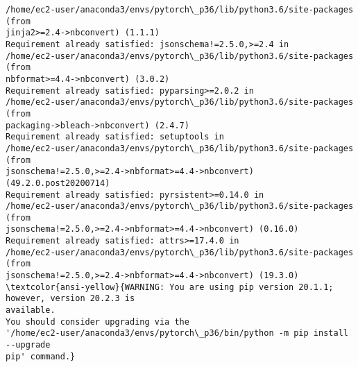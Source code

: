 \documentclass[11pt]{article}
\makeatletter
\newcommand{\boxspacing}{\kern\kvtcb@left@rule\kern\kvtcb@boxsep}
\newcommand{\prompt}[4]{
        \ttfamily\llap{{\color{#2}[#3]:\hspace{3pt}#4}}\vspace{-\baselineskip}
    }
\makeatother
\begin{document}
\begin{Verbatim}[commandchars=\\\{\}]
/home/ec2-user/anaconda3/envs/pytorch\_p36/lib/python3.6/site-packages (from
jinja2>=2.4->nbconvert) (1.1.1)
Requirement already satisfied: jsonschema!=2.5.0,>=2.4 in
/home/ec2-user/anaconda3/envs/pytorch\_p36/lib/python3.6/site-packages (from
nbformat>=4.4->nbconvert) (3.0.2)
Requirement already satisfied: pyparsing>=2.0.2 in
/home/ec2-user/anaconda3/envs/pytorch\_p36/lib/python3.6/site-packages (from
packaging->bleach->nbconvert) (2.4.7)
Requirement already satisfied: setuptools in
/home/ec2-user/anaconda3/envs/pytorch\_p36/lib/python3.6/site-packages (from
jsonschema!=2.5.0,>=2.4->nbformat>=4.4->nbconvert) (49.2.0.post20200714)
Requirement already satisfied: pyrsistent>=0.14.0 in
/home/ec2-user/anaconda3/envs/pytorch\_p36/lib/python3.6/site-packages (from
jsonschema!=2.5.0,>=2.4->nbformat>=4.4->nbconvert) (0.16.0)
Requirement already satisfied: attrs>=17.4.0 in
/home/ec2-user/anaconda3/envs/pytorch\_p36/lib/python3.6/site-packages (from
jsonschema!=2.5.0,>=2.4->nbformat>=4.4->nbconvert) (19.3.0)
\textcolor{ansi-yellow}{WARNING: You are using pip version 20.1.1; however, version 20.2.3 is
available.
You should consider upgrading via the
'/home/ec2-user/anaconda3/envs/pytorch\_p36/bin/python -m pip install --upgrade
pip' command.}
    \end{Verbatim}

    \begin{tcolorbox}[breakable, size=fbox, boxrule=1pt, pad at break*=1mm,colback=cellbackground, colframe=cellborder]
\prompt{In}{incolor}{ }{\boxspacing}
\begin{Verbatim}[commandchars=\\\{\}]

\end{Verbatim}
\end{tcolorbox}


    
    
    
\end{document}
